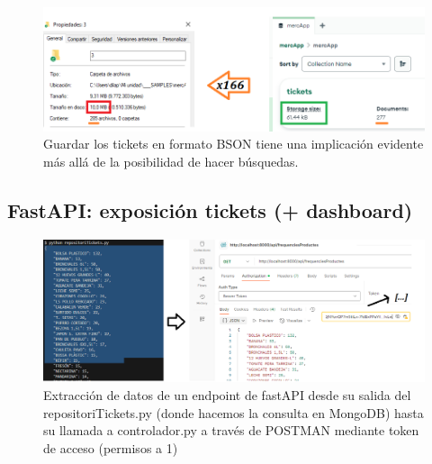 \documentclass{beamer}
\begin{document}
	
	\begin{frame}
		\begin{figure}
			\centering
			\includegraphics[width=1\linewidth]{imgEspecifiques/disminucioTamanyMongoDB}
			\caption{Guardar los tickets en formato BSON tiene una implicación evidente más allá de la posibilidad de hacer búsquedas.}
			\label{fig:disminuciotamanymongodb}
		\end{figure}
		
	\end{frame}
	
	
		\subsection{FastAPI: exposición tickets (+ dashboard)}
	
		\begin{frame}
			
			\begin{figure}
				\centering
				\includegraphics[width=1\linewidth]{imgEspecifiques/dashboardA}
				\caption{Extracción de datos de un endpoint de fastAPI desde su salida del repositoriTickets.py (donde hacemos la consulta en MongoDB) hasta su llamada a controlador.py a través de POSTMAN mediante token de acceso (permisos a 1)}
				\label{fig:dashboardA}
			\end{figure}
			
		\end{frame}
	
	
\end{document}
